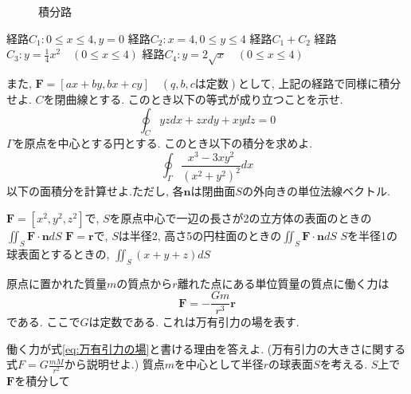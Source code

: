 \documentclass[a4j,dvipdfmx]{jsarticle}
\begin{document}
\begin{qparts}
\begin{figure}[h]
                \caption{積分路}\label{積分路}
            \end{figure}
            \begin{qlist}
                \qitem 経路$C_1:0\leq x\leq 4,y=0$
                \qitem 経路$C_2:x=4,0\leq y\leq 4$
                \qitem 経路$C_1+C_2$
                \qitem 経路$C_3:\displaystyle y=\frac{1}{4}x^2\quad (0\leq x\leq 4)$
                \qitem 経路$C_4:\displaystyle y=2\sqrt{x} \quad (0\leq x\leq 4)$
            \end{qlist}
            また, $\bm{F}=[ax+by,bx+cy]\quad(q,b,c\text{は定数})$として, 上記の経路で同様に積分せよ.
        \qpart $C$を閉曲線とする. このとき以下の等式が成り立つことを示せ.
            \begin{equation*}
                \oint_C yzdx+zxdy+xydz = 0
            \end{equation*}
        \qpart $\Gamma$を原点を中心とする円とする. このとき以下の積分を求めよ.
            \begin{equation*}
                \oint_\Gamma \frac{x^3-3xy^2}{(x^2+y^2)^2}dx
            \end{equation*}
        \qpart 以下の面積分を計算せよ.ただし, 各$\bm{n}$は閉曲面$S$の外向きの単位法線ベクトル.
            \begin{qlist}
                \qitem $\bm{F}=[x^2,y^2,z^2]$で, $S$を原点中心で一辺の長さが2の立方体の表面のときの$\displaystyle \iint_S \bm{F}\cdot\bm{n}dS$
                \qitem $\bm{F}=\bm{r}$で, $S$は半径2, 高さ5の円柱面のときの$\displaystyle \iint_S\bm{F}\cdot\bm{n}dS$
                \qitem $S$を半径1の球表面とするときの, $\displaystyle\iint_S (x+y+z)dS$
            \end{qlist}
        \qpart 原点に置かれた質量$m$の質点から$r$離れた点にある単位質量の質点に働く力は
            \begin{equation}
                \bm{F}=-\frac{Gm}{r^3}\bm{r} \label{eq:万有引力の場}        
            \end{equation}
            である. ここで$G$は定数である. これは万有引力の場を表す.
            \begin{qlist}
                \qitem 働く力が式\eqref{eq:万有引力の場}と書ける理由を答えよ. (万有引力の大きさに関する式$F=G\frac{mM}{r^2}$から説明せよ.)
                \qitem 質点$m$を中心として半径$r$の球表面$S$を考える. $S$上で$\bm{F}$を積分して

\end{qlist}
\end{qparts}
\end{document}
